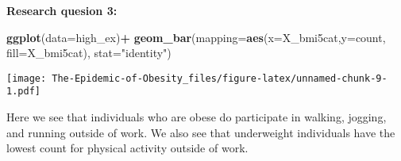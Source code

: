 \documentclass[
]{article}
\newenvironment{Shaded}{\begin{snugshade}}{\end{snugshade}}
\newcommand{\DataTypeTok}[1]{\textcolor[rgb]{0.13,0.29,0.53}{#1}}
\newcommand{\DecValTok}[1]{\textcolor[rgb]{0.00,0.00,0.81}{#1}}
\newcommand{\KeywordTok}[1]{\textcolor[rgb]{0.13,0.29,0.53}{\textbf{#1}}}
\newcommand{\NormalTok}[1]{#1}
\newcommand{\OperatorTok}[1]{\textcolor[rgb]{0.81,0.36,0.00}{\textbf{#1}}}
\newcommand{\StringTok}[1]{\textcolor[rgb]{0.31,0.60,0.02}{#1}}
\begin{document}
\textbf{Research quesion 3:}

\begin{Shaded}
\end{Shaded}

\begin{Shaded}
\end{Shaded}

\begin{Shaded}
\begin{Highlighting}[]
\KeywordTok{ggplot}\NormalTok{(}\DataTypeTok{data=}\NormalTok{high_ex)}\OperatorTok{+}\StringTok{ }
\StringTok{  }\KeywordTok{geom_bar}\NormalTok{(}\DataTypeTok{mapping=}\KeywordTok{aes}\NormalTok{(}\DataTypeTok{x=}\NormalTok{X_bmi5cat,}\DataTypeTok{y=}\NormalTok{count, }\DataTypeTok{fill=}\NormalTok{X_bmi5cat), }\DataTypeTok{stat=}\StringTok{"identity"}\NormalTok{)}
\end{Highlighting}
\end{Shaded}

\texttt{[image: The-Epidemic-of-Obesity\_files/figure-latex/unnamed-chunk-9-1.pdf]}

Here we see that individuals who are obese do participate in walking,
jogging, and running outside of work. We also see that underweight
individuals have the lowest count for physical activity outside of work.

\begin{Shaded}
\end{Shaded}
\end{document}
